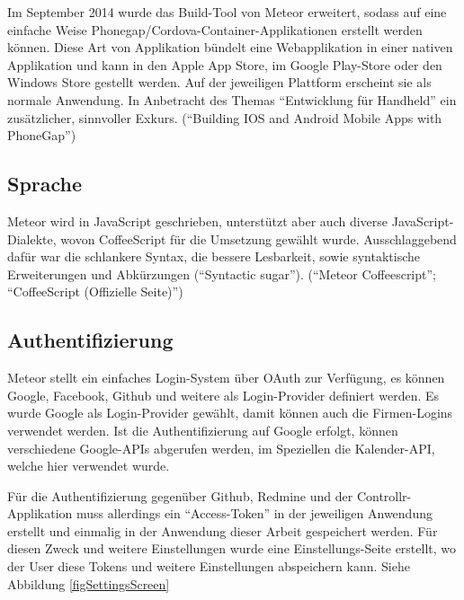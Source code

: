 \documentclass[]{article}
\begin{document}
Im September 2014 wurde das Build-Tool von Meteor erweitert, sodass auf
eine einfache Weise Phonegap/Cordova-Container-Applikationen erstellt
werden können. Diese Art von Applikation bündelt eine Webapplikation in
einer nativen Applikation und kann in den Apple App Store, im Google
Play-Store oder den Windows Store gestellt werden. Auf der jeweiligen
Plattform erscheint sie als normale Anwendung. In Anbetracht des Themas
``Entwicklung für Handheld'' ein zusätzlicher, sinnvoller Exkurs.
(``Building IOS and Android Mobile Apps with PhoneGap'')

\subsection{Sprache}\label{sprache}

Meteor wird in JavaScript geschrieben, unterstützt aber auch diverse
JavaScript-Dialekte, wovon CoffeeScript für die Umsetzung gewählt wurde.
Ausschlaggebend dafür war die schlankere Syntax, die bessere Lesbarkeit,
sowie syntaktische Erweiterungen und Abkürzungen (``Syntactic sugar'').
(``Meteor Coffeescript''; ``CoffeeScript (Offizielle Seite)'')

\subsection{Authentifizierung}\label{authentifizierung-4}

Meteor stellt ein einfaches Login-System über OAuth zur Verfügung, es
können Google, Facebook, Github und weitere als Login-Provider definiert
werden. Es wurde Google als Login-Provider gewählt, damit können auch
die Firmen-Logins verwendet werden. Ist die Authentifizierung auf Google
erfolgt, können verschiedene Google-APIs abgerufen werden, im Speziellen
die Kalender-API, welche hier verwendet wurde.

Für die Authentifizierung gegenüber Github, Redmine und der
Controllr-Applikation muss allerdings ein ``Access-Token'' in der
jeweiligen Anwendung erstellt und einmalig in der Anwendung dieser
Arbeit gespeichert werden. Für diesen Zweck und weitere Einstellungen
wurde eine Einstellungs-Seite erstellt, wo der User diese Tokens und
weitere Einstellungen abspeichern kann. Siehe Abbildung
\ref{figSettingsScreen}
\end{document}
